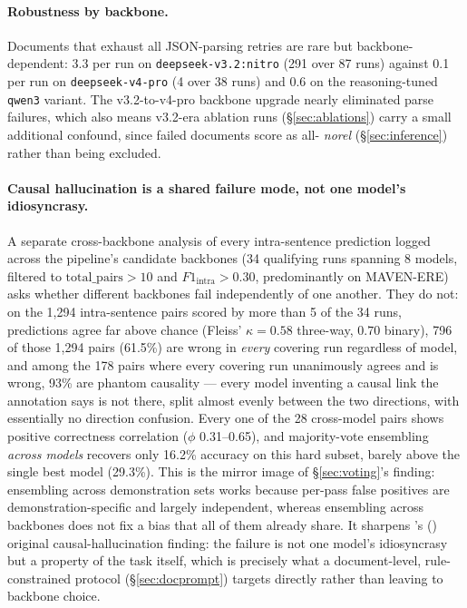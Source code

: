\documentclass[11pt]{article}
\begin{document}
\paragraph{Robustness by backbone.} Documents that exhaust all JSON-parsing
retries are rare but backbone-dependent: 3.3 per run on
\texttt{deepseek-v3.2:nitro} (291 over 87 runs) against 0.1 per run on
\texttt{deepseek-v4-pro} (4 over 38 runs) and 0.6 on the reasoning-tuned
\texttt{qwen3} variant. The v3.2-to-v4-pro backbone upgrade nearly eliminated
parse failures, which also means v3.2-era ablation runs (\S\ref{sec:ablations})
carry a small additional confound, since failed documents score as all-
\textit{norel} (\S\ref{sec:inference}) rather than being excluded.

\paragraph{Causal hallucination is a shared failure mode, not one model's
idiosyncrasy.} A separate cross-backbone analysis of every intra-sentence
prediction logged across the pipeline's candidate backbones (34 qualifying runs
spanning 8 models, filtered to $\mathrm{total\_pairs}>10$ and
$F1_{\text{intra}}>0.30$, predominantly on MAVEN-ERE) asks whether different
backbones fail independently of one another. They do not: on the 1{,}294
intra-sentence pairs scored by more than 5 of the 34 runs, predictions agree far
above chance (Fleiss' $\kappa=0.58$ three-way, $0.70$ binary), 796 of those 1{,}294
pairs (61.5\%) are wrong in \emph{every} covering run regardless of model, and
among the 178 pairs where every covering run unanimously agrees and is wrong,
93\% are phantom causality --- every model inventing a causal link the annotation
says is not there, split almost evenly between the two directions, with
essentially no direction confusion. Every one of the 28 cross-model pairs shows
positive correctness correlation ($\phi$ 0.31--0.65), and majority-vote
ensembling \emph{across models} recovers only 16.2\% accuracy on this hard
subset, barely above the single best model (29.3\%). This is the mirror image of
\S\ref{sec:voting}'s finding: ensembling across demonstration sets works because
per-pass false positives are demonstration-specific and largely independent,
whereas ensembling across backbones does not fix a bias that all of them already
share. It sharpens \citeauthor{gao2023chatgpt}'s (\citeyear{gao2023chatgpt})
original causal-hallucination finding: the failure is not one model's
idiosyncrasy but a property of the task itself, which is precisely what a
document-level, rule-constrained protocol (\S\ref{sec:docprompt}) targets
directly rather than leaving to backbone choice.
\end{document}
